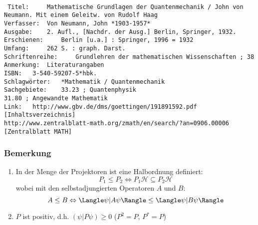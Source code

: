 \documentclass[twoside,a4paper]{scrartcl}
\renewcommand{\1}{\mathds{1}}
\begin{document}
\begin{tiny}
\begin{verbatim}

 Titel: 	Mathematische Grundlagen der Quantenmechanik / John von Neumann. Mit einem Geleitw. von Rudolf Haag
Verfasser: 	Von Neumann, John *1903-1957*
Ausgabe: 	2. Aufl., [Nachdr. der Ausg.] Berlin, Springer, 1932.
Erschienen: 	Berlin [u.a.] : Springer, 1996 = 1932
Umfang: 	262 S. : graph. Darst.
Schriftenreihe: 	Grundlehren der mathematischen Wissenschaften ; 38
Anmerkung: 	Literaturangaben
ISBN: 	3-540-59207-5*hbk.
Schlagwörter: 	*Mathematik / Quantenmechanik
Sachgebiete: 	33.23 ; Quantenphysik
31.80 ; Angewandte Mathematik
Link: 	http://www.gbv.de/dms/goettingen/191891592.pdf [Inhaltsverzeichnis]
http://www.zentralblatt-math.org/zmath/en/search/?an=0906.00006 [Zentralblatt MATH]
\end{verbatim}
\end{tiny}


\subsubsection*{Bemerkung}
\begin{enumerate}
 \item In der Menge der Projektoren ist eine Halbordnung definiert:
$$P_1 \leq P_2 \Leftrightarrow P_1 \mathcal H \subseteq P_2  \mathcal H$$
wobei mit den selbstadjungierten Operatoren $A$ und $B$:
$$A \leq B \Leftrightarrow \Langle \psi|A\psi\Rangle  \leq \Langle \psi|B\psi\Rangle $$
 \item $P$ ist positiv, d.h. $(\psi|P\psi)\geq 0$ ($P^2=P$, $P^*=P$)
\end{enumerate}
\end{document}
